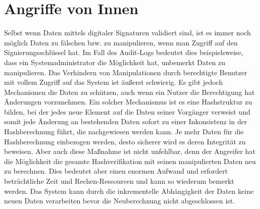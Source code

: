 \section{Angriffe von Innen}
Selbst wenn Daten mittels digitaler Signaturen validiert sind, ist es immer noch möglich Daten zu fälschen bzw. zu manipulieren, wenn man Zugriff auf den Signierungsschlüssel hat. Im Fall des Audit-Logs bedeutet dies beispielsweise, dass ein Systemadministrator die Möglichkeit hat, unbemerkt Daten zu manipulieren. Das Verhindern von Manipulationen durch berechtigte Benutzer mit vollem Zugriff auf das System ist äußerst schwierig. Es gibt jedoch Mechanismen die Daten zu schützen, auch wenn ein Nutzer die Berechtigung hat Änderungen vorzunehmen. Ein solcher Mechanismus ist es eine Hashstruktur zu bilden, bei der jedes neue Element auf die Daten seiner Vorgänger verweist und somit jede Änderung an bestehenden Daten sofort zu einer Inkonsistenz in der Hashberechnung führt, die nachgewiesen werden kann. Je mehr Daten für die Hashberechnung einbezogen werden, desto sicherer wird es deren Integrität zu beweisen. Aber auch diese Maßnahme ist nicht unfehlbar, denn der Angreifer hat die Möglichkeit die gesamte Hashverifikation mit seinen manipulierten Daten neu zu berechnen. Dies bedeutet aber einen enormen Aufwand und erfordert beträchtliche Zeit und Rechen-Ressourcen und kann so wiederum bemerkt werden. Das System kann durch die inkrementelle Abhängigkeit der Daten keine neuen Daten verarbeiten bevor die Neuberechnung nicht abgeschlossen ist. \cite{8494085} \cite{8574150} \cite{3286985}
